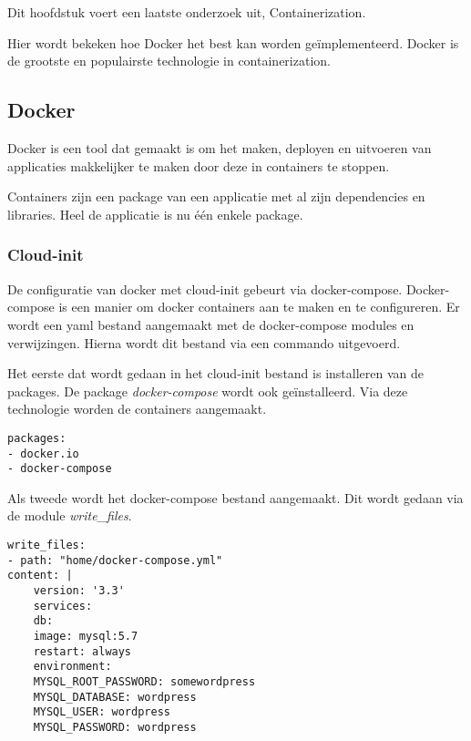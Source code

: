 \chapter{}
\label{ch:container}
Dit hoofdstuk voert een laatste onderzoek uit, Containerization.

Hier wordt bekeken hoe Docker het best kan worden geïmplementeerd. Docker is de grootste en populairste technologie in containerization.

\section{Docker}
Docker is een tool dat gemaakt is om het maken, deployen en uitvoeren van applicaties makkelijker te maken door deze in containers te stoppen. 

Containers zijn een package van een applicatie met al zijn dependencies en libraries. Heel de applicatie is nu één enkele package. \autocite{docker}

\subsection{Cloud-init}
De configuratie van docker met cloud-init gebeurt via docker-compose. Docker-compose is een manier om docker containers aan te maken en te configureren. Er wordt een yaml bestand aangemaakt met de docker-compose modules en verwijzingen. Hierna wordt dit bestand via een commando uitgevoerd.

Het eerste dat wordt gedaan in het cloud-init bestand is installeren van de packages. De package \textit{docker-compose} wordt ook geïnstalleerd. Via deze technologie worden de containers aangemaakt.
\newpage
\begin{lstlisting}[basicstyle=\small]
packages:
- docker.io
- docker-compose
\end{lstlisting}

Als tweede wordt het docker-compose bestand aangemaakt. Dit wordt gedaan via de module \textit{write\_files}. 
\begin{lstlisting}[basicstyle=\small]
write_files:
- path: "home/docker-compose.yml"
content: |
    version: '3.3'
    services:
    db:
    image: mysql:5.7
    restart: always
    environment:
    MYSQL_ROOT_PASSWORD: somewordpress
    MYSQL_DATABASE: wordpress
    MYSQL_USER: wordpress
    MYSQL_PASSWORD: wordpress
\end{lstlisting}

